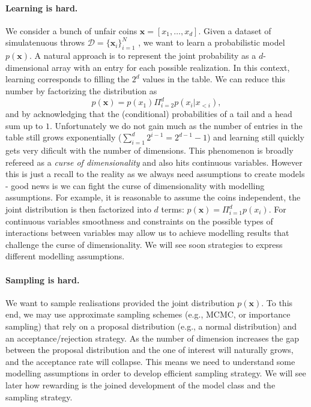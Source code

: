 \paragraph{Learning is hard.} We consider a bunch of unfair coins $\mathbf{x} = \left[x_1, \dots, x_d \right]$. Given a dataset of simulatenuous throws $\mathcal{D} = \{\mathbf{x}_i\}_{i=1}^N$ , we want to learn a probabilistic model $p(\mathbf{x})$. A natural approach is to represent the joint probability as a $d$-dimensional array with an entry for each possible realization. In this context, learning corresponds to filling the $2^d$ values in the table. We can reduce this number by factorizing the distribution as
$$p(\mathbf{x}) = p(x_1)\Pi_{i=2}^d p(x_i|x_{<i}),$$ and by acknowledging that the (conditional) probabilities of a tail and a head sum up to $1$. Unfortunately we do not gain much as the number of entries in the table still grows exponentially ($\sum_{i=1}^d 2^{i-1} = 2^{d-1} - 1$) and learning still quickly gets very dificult with the number of dimensions. This phenomenon is broadly refereed as a \textit{curse of dimensionality} and also hits continuous variables. However this is just a recall to the reality as we always need assumptions to create models - good news is we can fight the curse of dimensionality with modelling assumptions. For example, it is reasonable to assume the coins independent, the joint distribution is then factorized into $d$ terms: $ p(\bm{x}) = \Pi_{i=1}^d p(x_i)$. For continuous variables smoothness and constraints on the possible types of interactions between variables may allow us to achieve modelling results that challenge the curse of dimensionality. We will see soon strategies to express different modelling assumptions.

\paragraph{Sampling is hard.} We want to sample realisations provided the joint distribution $p(\bm x)$. To this end, we may use approximate sampling schemes (e.g., MCMC, or importance sampling) that rely on a proposal distribution (e.g., a normal distribution) and an acceptance/rejection strategy. As the number of dimension increases the gap between the proposal distribution and the one of interest will naturally grows, and the acceptance rate will collapse. This means we need to understand some modelling assumptions in order to develop efficient sampling strategy. We will see later how rewarding is the joined development of the model class and the sampling strategy.


